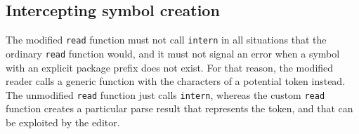\subsection{Intercepting symbol creation}

The modified \texttt{read} function must not call \texttt{intern} in
all situations that the ordinary \texttt{read} function would, and it
must not signal an error when a symbol with an explicit package prefix
does not exist.  For that reason, the modified reader calls a generic
function with the characters of a potential token instead.  The
unmodified \texttt{read} function just calls \texttt{intern}, whereas
the custom \texttt{read} function creates a particular parse result
that represents the token, and that can be exploited by the
editor.
